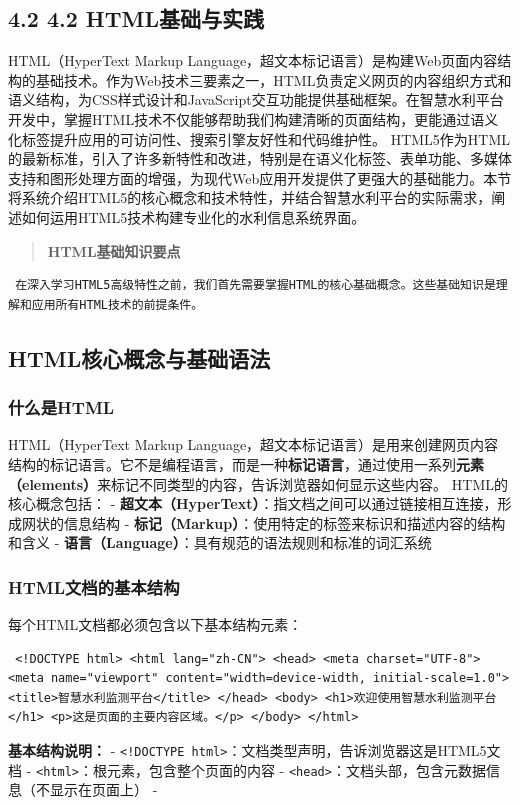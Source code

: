 \subsection{4.2 4.2 HTML基础与实践}\label{htmlux57faux7840ux4e0eux5b9eux8df5} HTML（HyperText Markup Language，超文本标记语言）是构建Web页面内容结构的基础技术。作为Web技术三要素之一，HTML负责定义网页的内容组织方式和语义结构，为CSS样式设计和JavaScript交互功能提供基础框架。在智慧水利平台开发中，掌握HTML技术不仅能够帮助我们构建清晰的页面结构，更能通过语义化标签提升应用的可访问性、搜索引擎友好性和代码维护性。 HTML5作为HTML的最新标准，引入了许多新特性和改进，特别是在语义化标签、表单功能、多媒体支持和图形处理方面的增强，为现代Web应用开发提供了更强大的基础能力。本节将系统介绍HTML5的核心概念和技术特性，并结合智慧水利平台的实际需求，阐述如何运用HTML5技术构建专业化的水利信息系统界面。 \begin{quote} \textbf{HTML基础知识要点} \end{quote} \begin{verbatim} 在深入学习HTML5高级特性之前，我们首先需要掌握HTML的核心基础概念。这些基础知识是理解和应用所有HTML技术的前提条件。 \end{verbatim} \subsection{HTML核心概念与基础语法}\label{htmlux6838ux5fc3ux6982ux5ff5ux4e0eux57faux7840ux8bedux6cd5} \subsubsection{什么是HTML}\label{ux4ec0ux4e48ux662fhtml} HTML（HyperText Markup Language，超文本标记语言）是用来创建网页内容结构的标记语言。它不是编程语言，而是一种\textbf{标记语言}，通过使用一系列\textbf{元素（elements）}来标记不同类型的内容，告诉浏览器如何显示这些内容。 HTML的核心概念包括： - \textbf{超文本（HyperText）}：指文档之间可以通过链接相互连接，形成网状的信息结构 - \textbf{标记（Markup）}：使用特定的标签来标识和描述内容的结构和含义 - \textbf{语言（Language）}：具有规范的语法规则和标准的词汇系统 \subsubsection{HTML文档的基本结构}\label{htmlux6587ux6863ux7684ux57faux672cux7ed3ux6784} 每个HTML文档都必须包含以下基本结构元素： \begin{verbatim} <!DOCTYPE html> <html lang="zh-CN"> <head> <meta charset="UTF-8"> <meta name="viewport" content="width=device-width, initial-scale=1.0"> <title>智慧水利监测平台</title> </head> <body> <h1>欢迎使用智慧水利监测平台</h1> <p>这是页面的主要内容区域。</p> </body> </html> \end{verbatim} \textbf{基本结构说明：} - \texttt{\textless{}!DOCTYPE\ html\textgreater{}}：文档类型声明，告诉浏览器这是HTML5文档 - \texttt{\textless{}html\textgreater{}}：根元素，包含整个页面的内容 - \texttt{\textless{}head\textgreater{}}：文档头部，包含元数据信息（不显示在页面上） - 